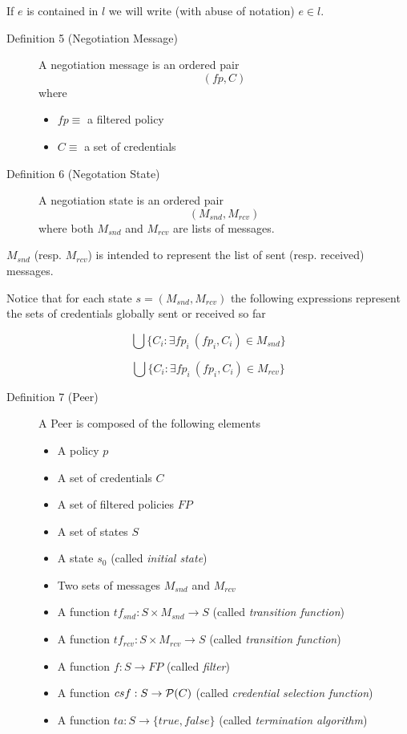 \documentclass{article}
\begin{document}
If $e$ is contained in $l$ we will write (with abuse of notation) $e \in l$.

\begin{description}
\item[Definition 5 (Negotiation Message)] A negotiation message is an ordered pair
  \begin{displaymath}
  (fp, C)
  \end{displaymath}
  where
  \begin{itemize}
	\item $fp \equiv$ a filtered policy
	\item $C \equiv$ a set of credentials
  \end{itemize}
\item[Definition 6 (Negotation State)] A negotiation state is an ordered pair
  \begin{displaymath}
  (M_{snd}, M_{rcv})
  \end{displaymath}
  where both $M_{snd}$ and $M_{rcv}$ are lists of messages.
\end{description}

$M_{snd}$ (resp. $M_{rcv}$) is intended to represent the list of sent (resp. received) messages.

Notice that for each state $s=(M_{snd}, M_{rcv})$ the following expressions represent the sets of credentials globally sent or received so far

\begin{displaymath}
\bigcup \{C_{i} : \exists fp_{i}\ (fp_{i}, C_{i}) \in M_{snd}\}
\end{displaymath}

\begin{displaymath}
\bigcup \{C_{i} : \exists fp_{i}\ (fp_{i}, C_{i}) \in M_{rcv}\}
\end{displaymath}

\begin{description}
\item[Definition 7 (Peer)] A Peer is composed of the following elements
  \begin{itemize}
	\item A policy $p$
	\item A set of credentials $C$
	\item A set of filtered policies $FP$
	\item A set of states $S$
	\item A state $s_{0}$ (called \textit{initial state})
	\item Two sets of messages $M_{snd}$ and $M_{rcv}$
	\item A function $tf_{snd}:S \times M_{snd} \rightarrow S$ (called \textit{transition function})
	\item A function $tf_{rcv}:S \times M_{rcv} \rightarrow S$ (called \textit{transition function})
	\item A function $f:S \rightarrow FP$ (called \textit{filter})
	\item A function $csf:S \rightarrow {\cal P}(C)$ (called \textit{credential selection function})
	\item A function $ta:S \rightarrow \{true, false\}$ (called \textit{termination algorithm})
  \end{itemize}
\end{description}
\end{document}
